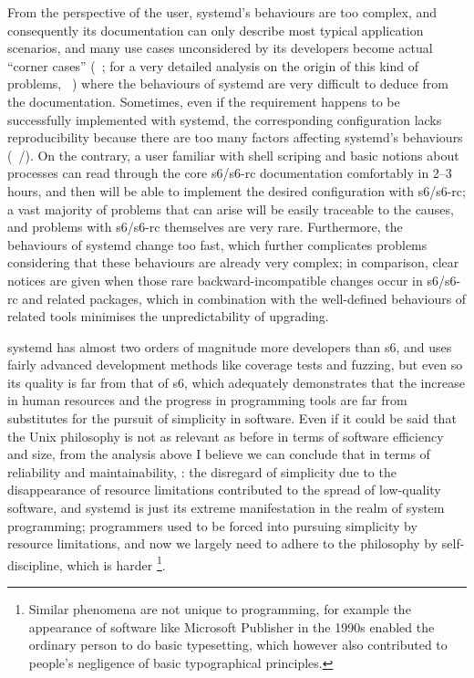 From the perspective of the user, systemd's behaviours are too complex, and
consequently its documentation can only describe most typical application
scenarios, and many use cases unconsidered by its developers become actual
``corner cases'' (\eg~\parencite{dbiii2016}; for a very detailed analysis
on the origin of this kind of problems, \cf~\parencite{vr2015}) where the
behaviours of systemd are very difficult to deduce from the documentation.
Sometimes, even if the requirement happens to be successfully implemented
with systemd, the corresponding configuration lacks reproducibility because
there are too many factors affecting systemd's behaviours (\eg~\parencite%
{fitzcarraldo2018}/\parencite{zlogic2019}).  On the contrary, a user familiar
with shell scriping and basic notions about processes can read through the
core s6/s6-rc documentation comfortably in 2--3 hours, and then will be able
to implement the desired configuration with s6/s6-rc; a vast majority of
problems that can arise will be easily traceable to the causes, and problems
with s6/s6-rc themselves are very rare.  Furthermore,
the behaviours of systemd change too fast, which
further complicates problems considering that these behaviours are already
very complex; in comparison, clear notices are given when those rare
backward-incompatible changes occur in s6/s6-rc and related packages,
which in combination with the well-defined behaviours of related
tools minimises the unpredictability of upgrading.

systemd has almost two orders of magnitude more developers than s6, and uses
fairly advanced development methods like coverage tests and fuzzing, but even
so its quality is far from that of s6, which adequately demonstrates that the
increase in human resources and the progress in programming tools are far from
substitutes for the pursuit of simplicity in software.  Even if it could be
said that the Unix philosophy is not as relevant as before in terms of software
efficiency and size, from the analysis above I believe we can conclude that in
terms of reliability and maintainability, : the disregard of
simplicity due to the disappearance of resource limitations contributed to the
spread of low-quality software, and systemd is just its extreme manifestation
in the realm of system programming; programmers used
to be forced into pursuing simplicity by resource limitations, and now we
largely need to adhere to the philosophy by self-discipline, which is harder%
\footnote{Similar phenomena are not unique to programming, for example
the appearance of software like Microsoft Publisher in the 1990s enabled
the ordinary person to do basic typesetting,
which however also contributed to people's negligence of
basic typographical principles.}.

